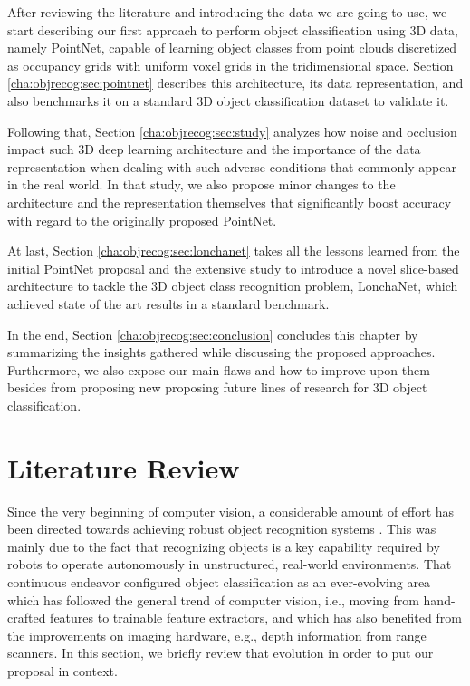 After reviewing the literature and introducing the data we are going to use, we start describing our first approach to perform object classification using 3D data, namely PointNet, capable of learning object classes from point clouds discretized as occupancy grids with uniform voxel grids in the tridimensional space. Section \ref{cha:objrecog:sec:pointnet} describes this architecture, its data representation, and also benchmarks it on a standard 3D object classification dataset to validate it.

Following that, Section \ref{cha:objrecog:sec:study} analyzes how noise and occlusion impact such 3D deep learning architecture and the importance of the data representation when dealing with such adverse conditions that commonly appear in the real world. In that study, we also propose minor changes to the architecture and the representation themselves that significantly boost accuracy with regard to the originally proposed PointNet.

At last, Section \ref{cha:objrecog:sec:lonchanet} takes all the lessons learned from the initial PointNet proposal and the extensive study to introduce a novel slice-based architecture to tackle the 3D object class recognition problem, LonchaNet, which achieved state of the art results in a standard benchmark.

In the end, Section \ref{cha:objrecog:sec:conclusion} concludes this chapter by summarizing the insights gathered while discussing the proposed approaches. Furthermore, we also expose our main flaws and how to improve upon them besides from proposing new proposing future lines of research for 3D object classification.

\section{Literature Review}
\label{cha:objrecog:sec:relatedworks}

Since the very beginning of computer vision, a considerable amount of effort has been directed towards achieving robust object recognition systems \cite{Andreopoulos2013}. This was mainly due to the fact that recognizing objects is a key capability required by robots to operate autonomously in unstructured, real-world environments. That continuous endeavor configured object classification as an ever-evolving area which has followed the general trend of computer vision, i.e., moving from hand-crafted features to trainable feature extractors, and which has also benefited from the improvements on imaging hardware, e.g., depth information from range scanners. In this section, we briefly review that evolution in order to put our proposal in context.

